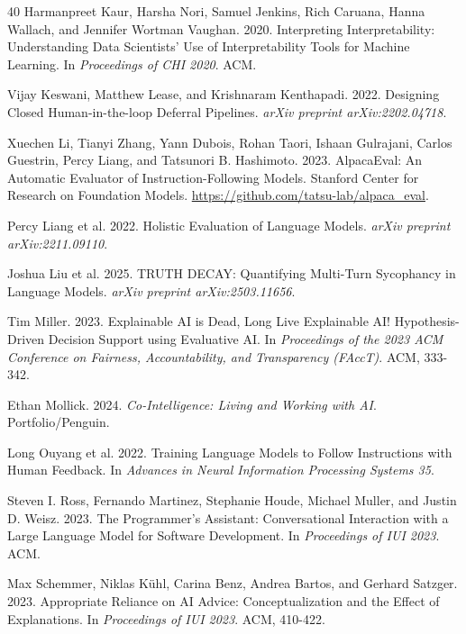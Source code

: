 \documentclass{article}
\begin{document}
\begin{thebibliography}{40}
Harmanpreet Kaur, Harsha Nori, Samuel Jenkins, Rich Caruana, Hanna Wallach, and Jennifer Wortman Vaughan. 2020.
\newblock Interpreting Interpretability: Understanding Data Scientists' Use of Interpretability Tools for Machine Learning.
\newblock In \textit{Proceedings of CHI 2020}. ACM.

Vijay Keswani, Matthew Lease, and Krishnaram Kenthapadi. 2022.
\newblock Designing Closed Human-in-the-loop Deferral Pipelines.
\newblock \textit{arXiv preprint arXiv:2202.04718}.

Xuechen Li, Tianyi Zhang, Yann Dubois, Rohan Taori, Ishaan Gulrajani, Carlos Guestrin, Percy Liang, and Tatsunori B. Hashimoto. 2023.
\newblock AlpacaEval: An Automatic Evaluator of Instruction-Following Models.
\newblock Stanford Center for Research on Foundation Models. \url{https://github.com/tatsu-lab/alpaca_eval}.

Percy Liang et al. 2022.
\newblock Holistic Evaluation of Language Models.
\newblock \textit{arXiv preprint arXiv:2211.09110}.

Joshua Liu et al. 2025.
\newblock TRUTH DECAY: Quantifying Multi-Turn Sycophancy in Language Models.
\newblock \textit{arXiv preprint arXiv:2503.11656}.

Tim Miller. 2023.
\newblock Explainable AI is Dead, Long Live Explainable AI! Hypothesis-Driven Decision Support using Evaluative AI.
\newblock In \textit{Proceedings of the 2023 ACM Conference on Fairness, Accountability, and Transparency (FAccT)}. ACM, 333-342.

Ethan Mollick. 2024.
\newblock \textit{Co-Intelligence: Living and Working with AI}.
\newblock Portfolio/Penguin.

Long Ouyang et al. 2022.
\newblock Training Language Models to Follow Instructions with Human Feedback.
\newblock In \textit{Advances in Neural Information Processing Systems 35}.

Steven I. Ross, Fernando Martinez, Stephanie Houde, Michael Muller, and Justin D. Weisz. 2023.
\newblock The Programmer's Assistant: Conversational Interaction with a Large Language Model for Software Development.
\newblock In \textit{Proceedings of IUI 2023}. ACM.

Max Schemmer, Niklas K\"{u}hl, Carina Benz, Andrea Bartos, and Gerhard Satzger. 2023.
\newblock Appropriate Reliance on AI Advice: Conceptualization and the Effect of Explanations.
\newblock In \textit{Proceedings of IUI 2023}. ACM, 410-422.


\end{thebibliography}
\end{document}
